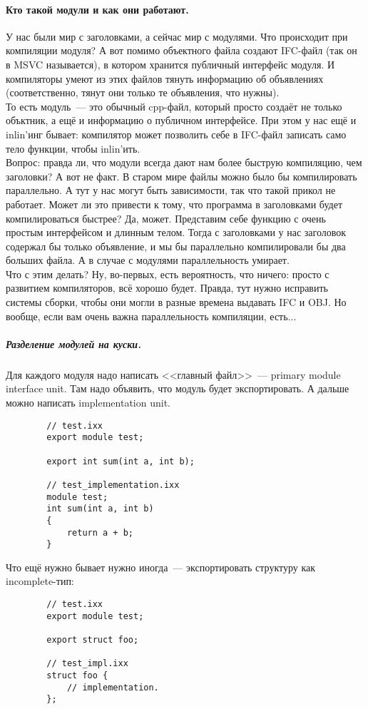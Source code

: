 \documentclass{article}
\begin{document}
    \paragraph{Кто такой модули и как они работают.}
    У нас были мир с заголовками, а сейчас мир с модулями. Что происходит при компиляции модуля? А вот помимо объектного файла создают IFC-файл (так он в MSVC называется), в котором хранится публичный интерфейс модуля. И компиляторы умеют из этих файлов тянуть информацию об объявлениях (соответственно, тянут они только те объявления, что нужны).\\
    То есть модуль~--- это обычный cpp-файл, который просто создаёт не только объктник, а ещё и информацию о публичном интерфейсе. При этом у нас ещё и inlin'инг бывает: компилятор может позволить себе в IFC-файл записать само тело функции, чтобы inlin'ить.\\
    Вопрос: правда ли, что модули всегда дают нам более быструю компиляцию, чем заголовки? А вот не факт. В старом мире файлы можно было бы компилировать параллельно. А тут у нас могут быть зависимости, так что такой прикол не работает. Может ли это привести к тому, что программа в заголовками будет компилироваться быстрее? Да, может. Представим себе функцию с очень простым интерфейсом и длинным телом. Тогда с заголовками у нас заголовок содержал бы только объявление, и мы бы параллельно компилировали бы два больших файла. А в случае с модулями параллельность умирает.\\
    Что с этим делать? Ну, во-первых, есть вероятность, что ничего: просто с развитием компиляторов, всё хорошо будет. Правда, тут нужно исправить системы сборки, чтобы они могли в разные времена выдавать IFC и OBJ. Но вообще, если вам очень важна параллельность компиляции, есть...
    \subparagraph{Разделение модулей на куски.}
    Для каждого модуля надо написать <<главный файл>>~--- primary module interface unit. Там надо объявить, что модуль будет экспортировать. А дальше можно написать implementation unit.
    \begin{verbatim}
        // test.ixx
        export module test;
        
        export int sum(int a, int b);

        // test_implementation.ixx
        module test;
        int sum(int a, int b)
        {
            return a + b;
        }
    \end{verbatim}
    Что ещё нужно бывает нужно иногда~--- экспортировать структуру как incomplete-тип:
    \begin{verbatim}
        // test.ixx
        export module test;

        export struct foo;

        // test_impl.ixx
        struct foo {
            // implementation.
        };
    \end{verbatim}
\end{document}
